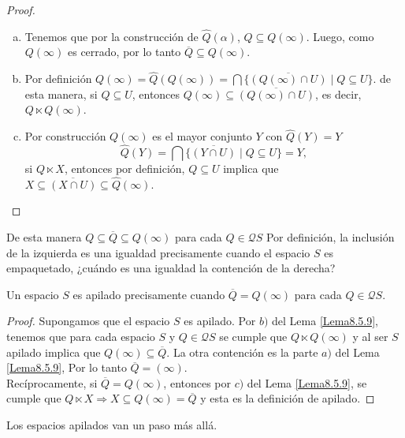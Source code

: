 \begin{proof}
    \begin{enumerate}[a)]
        \item Tenemos que por la construcción de $\hat{Q}(\alpha)$, $Q\subseteq Q(\infty)$. Luego, como $Q(\infty)$ es cerrado, por lo tanto $\overline{Q}\subseteq Q(\infty)$.

        \item Por definición $Q(\infty)=\hat{Q}(Q(\infty))=\bigcap\{\overline{(Q(\infty)\cap U)}\mid Q\subseteq U\}$. de esta manera, si $Q\subseteq U$, entonces $Q(\infty)\subseteq \overline{(Q(\infty)\cap U)}$, es decir, $Q\ltimes Q(\infty)$.

        \item Por construcción $Q(\infty)$ es el mayor conjunto $Y$ con $\hat{Q}(Y)=Y$
        \[
        \hat{Q}(Y)=\bigcap\{\overline{(Y\cap U)}\mid Q\subseteq U\}=Y,
        \]
        si $Q\ltimes X$, entonces por definición, $Q\subseteq U$ implica que $X\subseteq \overline{(X\cap U)}\subseteq \hat{Q}(\infty)$.
    \end{enumerate}
\end{proof}

De esta manera $Q\subseteq \overline{Q}\subseteq Q(\infty)$ para cada $Q\in \mathcal{Q}S$ Por definición, la inclusión de la izquierda es una igualdad precisamente cuando el espacio $S$ es empaquetado, ¿cuándo es una igualdad la contención de la derecha?

\begin{cor}\label{Corolario8.5.10}
    Un espacio $S$ es apilado precisamente cuando $\overline{Q}=Q(\infty)$ para cada $Q\in \mathcal{Q}S$.
\end{cor}

\begin{proof}
    Supongamos que el espacio $S$ es apilado. Por $b)$ del Lema \ref{Lema8.5.9}, tenemos que para cada espacio $S$ y $Q\in \mathcal{Q}S$ se cumple que $Q\ltimes Q(\infty)$ y al ser $S$ apilado implica que $Q(\infty)\subseteq \overline{Q}$. La otra contención es la parte $a)$ del Lema \ref{Lema8.5.9}, Por lo tanto $\overline{Q}=(\infty)$.\\

    Recíprocamente, si $\overline{Q}=Q(\infty)$, entonces por $c)$ del Lema \ref{Lema8.5.9}, se cumple que $Q\ltimes X\Rightarrow X\subseteq Q(\infty)=\overline{Q}$ y esta es la definición de apilado.
\end{proof}

Los espacios apilados van un paso más allá.


